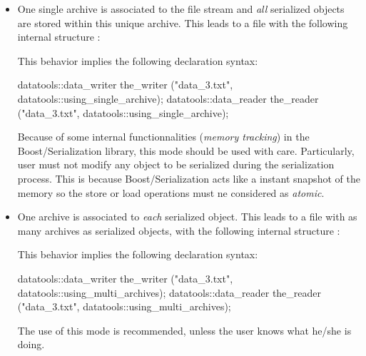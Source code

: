 \documentclass[a4paper,12pt]{article}
\newcommand{\pn}{\par\noindent}
\begin{document}
\begin{itemize}

\item  One  single  archive  is  associated to  the  file  stream  and
  \emph{all}  serialized   objects  are  stored   within  this  unique
  archive. This leads to a  file with the following internal structure
  :

\pn This behavior implies the following declaration syntax:
\begin{CppVerbatim}
datatools::data_writer the_writer ("data_3.txt", datatools::using_single_archive);
datatools::data_reader the_reader ("data_3.txt", datatools::using_single_archive);
\end{CppVerbatim}

\pn Because of some internal functionnalities (\emph{memory tracking})
in  the Boost/Serialization  library, this  mode should  be  used with
care. Particularly, user must not modify any object to be serialized
during the serialization process. This is because Boost/Serialization
acts like a instant snapshot of the memory so the store or load operations
must ne considered as \emph{atomic}.

\item One archive is associated to  \emph{each} serialized
object. This leads to a file with as many archives as serialized objects, with
the following internal structure :
\pn This behavior implies the following declaration syntax:
\begin{CppVerbatim}
datatools::data_writer the_writer ("data_3.txt", datatools::using_multi_archives);
datatools::data_reader the_reader ("data_3.txt", datatools::using_multi_archives);
\end{CppVerbatim}

\pn The use of this mode is recommended,
unless the user knows what he/she is doing.
\end{itemize}
\end{document}
